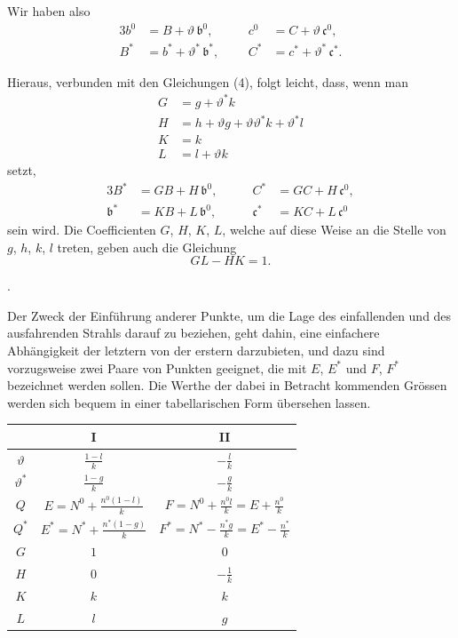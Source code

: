 \documentclass[11pt,a4paper]{article}
\begin{document}
Wir haben also
\begin{alignat*}{3}
b^0 &= B + \vartheta\,\mathfrak{b}^0, \qquad & c^0 &= C + \vartheta\,\mathfrak{c}^0, \\
B^* &= b^* + \vartheta^*\,\mathfrak{b}^*, & C^* &= c^* + \vartheta^*\,\mathfrak{c}^*.
\end{alignat*}

Hieraus, verbunden mit den Gleichungen (4), folgt leicht, dass, wenn man
\begin{align*}
G &= g + \vartheta^* k \\
H &= h + \vartheta g + \vartheta\vartheta^* k + \vartheta^* l \\
K &= k \\
L &= l + \vartheta k
\end{align*}
setzt,
\begin{alignat*}{3}
B^* &= G B + H\,\mathfrak{b}^0, \qquad & C^* &= G C + H\,\mathfrak{c}^0, \\
\mathfrak{b}^* &= K B + L\,\mathfrak{b}^0, & \mathfrak{c}^* &= K C + L\,\mathfrak{c}^0
\end{alignat*}
sein wird. Die Coefficienten $G$, $H$, $K$, $L$, welche auf diese Weise an die Stelle von $g$, $h$, $k$, $l$ treten, geben auch die Gleichung
\[
GL - HK = 1.
\]

\bigskip{}.

\smallskip
Der Zweck der Einführung anderer Punkte, um die Lage des einfallenden und des ausfahrenden Strahls darauf zu beziehen, geht dahin, eine einfachere Abhängigkeit der letztern von der erstern darzubieten, und dazu sind vorzugsweise zwei Paare von Punkten geeignet, die mit $E$, $E^*$ und $F$, $F^*$ bezeichnet werden sollen. Die Werthe der dabei in Betracht kommenden Grössen werden sich bequem in einer tabellarischen Form übersehen lassen.

\begin{center}
\begin{tabular}{c|c|c}
& I & II \\
\hline
$\vartheta$ & $\frac{1-l}{k}$ & $-\frac{l}{k}$ \\
\addlinespace
$\vartheta^*$ & $\frac{1-g}{k}$ & $-\frac{g}{k}$ \\
\addlinespace
$Q$ & $E = N^0 + \frac{n^0(1-l)}{k}$ & $F = N^0 + \frac{n^0 l}{k} = E + \frac{n^0}{k}$ \\
\addlinespace
$Q^*$ & $E^* = N^* + \frac{n^*(1-g)}{k}$ & $F^* = N^* - \frac{n^* g}{k} = E^* - \frac{n^*}{k}$ \\
\addlinespace
$G$ & $1$ & $0$ \\
\addlinespace
$H$ & $0$ & $-\frac{1}{k}$ \\
\addlinespace
$K$ & $k$ & $k$ \\
\addlinespace
$L$ & $l$ & $g$
\end{tabular}
\end{center}
\end{document}
